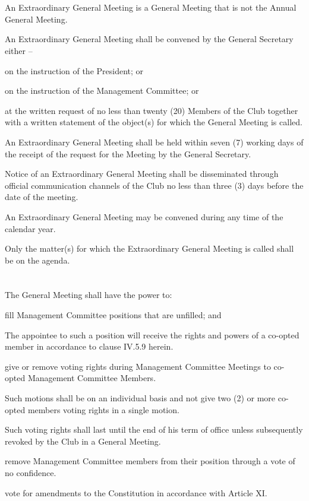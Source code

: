 \section{}
An Extraordinary General Meeting is a General Meeting that is not the Annual General Meeting.
	\begin{legal}
	\item An Extraordinary General Meeting shall be convened by the General Secretary either –
		\begin{legal}
		\item on the instruction of the President; or
		\item on the instruction of the Management Committee; or
		\item at the written request of no less than twenty (20) Members of the Club together with a written statement of the object(s) for which the General Meeting is called.
		\end{legal}
	\item An Extraordinary General Meeting shall be held within seven (7) working days of the receipt of the request for the Meeting by the General Secretary.
	\item Notice of an Extraordinary General Meeting shall be disseminated through official communication channels of the Club no less than three (3) days before the date of the meeting.
	\item An Extraordinary General Meeting may be convened during any time of the calendar year.
	\item Only the matter(s) for which the Extraordinary General Meeting is called shall be on the agenda.
	\end{legal}

\section{}
The General Meeting shall have the power to:
	\begin{legal}
	\item fill Management Committee positions that are unfilled; and
		\begin{legal}
		\item The appointee to such a position will receive the rights and powers of a co-opted member in accordance to clause IV.5.9 herein.
		\end{legal}
	\item give or remove voting rights during Management Committee Meetings to co-opted Management Committee Members.
		\begin{legal}
		\item Such motions shall be on an individual basis and not give two (2) or more co-opted members voting rights in a single motion.
		\item Such voting rights shall last until the end of his term of office unless subsequently revoked by the Club in a General Meeting.
		\end{legal}
	\item remove Management Committee members from their position through a vote of no confidence.
	\item vote for amendments to the Constitution in accordance with Article XI.
	\end{legal}

